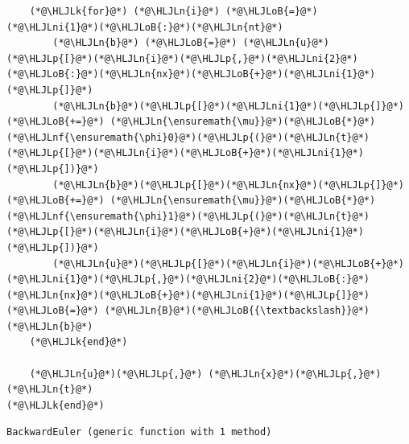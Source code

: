 \documentclass[12pt,a4paper]{article}
\newcommand{\HLJLk}[1]{\textcolor[RGB]{148,91,176}{\textbf{#1}}}
\newcommand{\HLJLn}[1]{#1}
\newcommand{\HLJLnf}[1]{\textcolor[RGB]{66,102,213}{#1}}
\newcommand{\HLJLni}[1]{\textcolor[RGB]{59,151,46}{#1}}
\newcommand{\HLJLoB}[1]{\textcolor[RGB]{102,102,102}{\textbf{#1}}}
\newcommand{\HLJLp}[1]{#1}
\begin{document}
\begin{lstlisting}
    (*@\HLJLk{for}@*) (*@\HLJLn{i}@*) (*@\HLJLoB{=}@*) (*@\HLJLni{1}@*)(*@\HLJLoB{:}@*)(*@\HLJLn{nt}@*)
        (*@\HLJLn{b}@*) (*@\HLJLoB{=}@*) (*@\HLJLn{u}@*)(*@\HLJLp{[}@*)(*@\HLJLn{i}@*)(*@\HLJLp{,}@*)(*@\HLJLni{2}@*)(*@\HLJLoB{:}@*)(*@\HLJLn{nx}@*)(*@\HLJLoB{+}@*)(*@\HLJLni{1}@*)(*@\HLJLp{]}@*) 
        (*@\HLJLn{b}@*)(*@\HLJLp{[}@*)(*@\HLJLni{1}@*)(*@\HLJLp{]}@*) (*@\HLJLoB{+=}@*) (*@\HLJLn{\ensuremath{\mu}}@*)(*@\HLJLoB{*}@*)(*@\HLJLnf{\ensuremath{\phi}0}@*)(*@\HLJLp{(}@*)(*@\HLJLn{t}@*)(*@\HLJLp{[}@*)(*@\HLJLn{i}@*)(*@\HLJLoB{+}@*)(*@\HLJLni{1}@*)(*@\HLJLp{])}@*)
        (*@\HLJLn{b}@*)(*@\HLJLp{[}@*)(*@\HLJLn{nx}@*)(*@\HLJLp{]}@*) (*@\HLJLoB{+=}@*) (*@\HLJLn{\ensuremath{\mu}}@*)(*@\HLJLoB{*}@*)(*@\HLJLnf{\ensuremath{\phi}1}@*)(*@\HLJLp{(}@*)(*@\HLJLn{t}@*)(*@\HLJLp{[}@*)(*@\HLJLn{i}@*)(*@\HLJLoB{+}@*)(*@\HLJLni{1}@*)(*@\HLJLp{])}@*)
        (*@\HLJLn{u}@*)(*@\HLJLp{[}@*)(*@\HLJLn{i}@*)(*@\HLJLoB{+}@*)(*@\HLJLni{1}@*)(*@\HLJLp{,}@*)(*@\HLJLni{2}@*)(*@\HLJLoB{:}@*)(*@\HLJLn{nx}@*)(*@\HLJLoB{+}@*)(*@\HLJLni{1}@*)(*@\HLJLp{]}@*) (*@\HLJLoB{=}@*) (*@\HLJLn{B}@*)(*@\HLJLoB{{\textbackslash}}@*)(*@\HLJLn{b}@*)
    (*@\HLJLk{end}@*)
    
    (*@\HLJLn{u}@*)(*@\HLJLp{,}@*) (*@\HLJLn{x}@*)(*@\HLJLp{,}@*) (*@\HLJLn{t}@*)
(*@\HLJLk{end}@*)
\end{lstlisting}

\begin{lstlisting}
BackwardEuler (generic function with 1 method)
\end{lstlisting}
\end{document}
